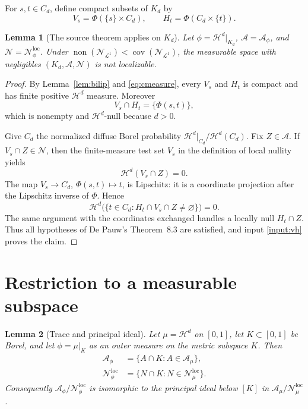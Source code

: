 \documentclass[11pt]{article}
\newtheorem{lemma}{Lemma}
\newcommand{\A}{\mathcal{A}}
\newcommand{\N}{\mathcal{N}}
\newcommand{\Hh}{\mathcal{H}}
\begin{document}
For $s,t\in C_d$, define compact subsets of $K_d$ by
\[
 V_s=\Phi(\{s\}\times C_d),\qquad
 H_t=\Phi(C_d\times\{t\}).
\]

\begin{lemma}[The source theorem applies on $K_d$]\label{lem:vh}
Let $\phi=\Hh^d|_{K_d}$, $\A=\A_\phi$, and
$\N=\N_\phi^{\mathrm{loc}}$.  Under
$\operatorname{non}(\N_{\mathcal L^1})<
\operatorname{cov}(\N_{\mathcal L^1})$, the measurable space with
negligibles $(K_d,\A,\N)$ is not localizable.
\end{lemma}

\begin{proof}
By Lemma~\ref{lem:bilip} and \eqref{eq:cmeasure}, every $V_s$ and $H_t$ is
compact and has finite positive $\Hh^d$ measure.  Moreover
\[
 V_s\cap H_t=\{\Phi(s,t)\},
\]
which is nonempty and $\Hh^d$-null because $d>0$.

Give $C_d$ the normalized diffuse Borel probability
$\Hh^d|_{C_d}/\Hh^d(C_d)$.  Fix $Z\in\A$.  If $V_s\cap Z\in\N$, then the
finite-measure test set $V_s$ in the definition of local nullity yields
\[
 \Hh^d(V_s\cap Z)=0.
\]
The map $V_s\to C_d$, $\Phi(s,t)\mapsto t$, is Lipschitz: it is a coordinate
projection after the Lipschitz inverse of $\Phi$.  Hence
\[
 \Hh^d\bigl(\{t\in C_d:H_t\cap V_s\cap Z\ne\varnothing\}\bigr)=0.
\]
The same argument with the coordinates exchanged handles a locally null
$H_t\cap Z$.  Thus all hypotheses of De Pauw's Theorem~8.3 are satisfied,
and input \ref{input:vh} proves the claim.
\end{proof}

\section*{Restriction to a measurable subspace}

\begin{lemma}[Trace and principal ideal]\label{lem:trace}
Let $\mu=\Hh^d$ on $[0,1]$, let $K\subset[0,1]$ be Borel, and let
$\phi=\mu|_K$ as an outer measure on the metric subspace $K$.  Then
\begin{align*}
 \A_\phi&=\{A\cap K:A\in\A_\mu\},\\
 \N_\phi^{\mathrm{loc}}&=
 \{N\cap K:N\in\N_\mu^{\mathrm{loc}}\}.
\end{align*}
Consequently
$\A_\phi/\N_\phi^{\mathrm{loc}}$ is isomorphic to the principal ideal below
$[K]$ in $\A_\mu/\N_\mu^{\mathrm{loc}}$.
\end{lemma}
\end{document}
